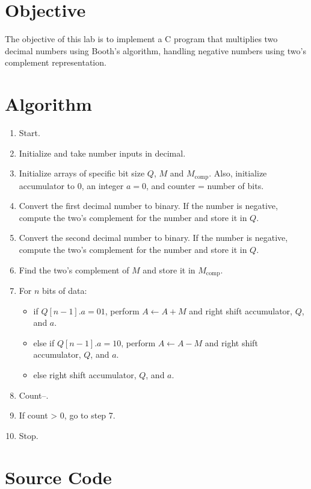 \documentclass[a4paper,12pt]{article}
\begin{document}
\section*{Objective}
The objective of this lab is to implement a C program that multiplies two decimal numbers using Booth's algorithm, handling negative numbers using two's complement representation.

\section*{Algorithm}
\begin{enumerate}
    \item Start.
    \item Initialize and take number inputs in decimal.
    \item Initialize arrays of specific bit size \(Q\), \(M\) and \(M_{\text{comp}}\). Also, initialize accumulator to 0, an integer \(a = 0\), and counter = number of bits.
    \item Convert the first decimal number to binary. If the number is negative, compute the two’s complement for the number and store it in \(Q\).
    \item Convert the second decimal number to binary. If the number is negative, compute the two’s complement for the number and store it in \(Q\).
    \item Find the two’s complement of \(M\) and store it in \(M_{\text{comp}}\).
    \item For \(n\) bits of data:
    \begin{itemize}
        \item if \(Q[n-1].a = 01\), perform \(A \leftarrow A + M\) and right shift accumulator, \(Q\), and \(a\).
        \item else if \(Q[n-1].a = 10\), perform \(A \leftarrow A - M\) and right shift accumulator, \(Q\), and \(a\).
        \item else right shift accumulator, \(Q\), and \(a\).
    \end{itemize}
    \item Count--.
    \item If count > 0, go to step 7.
    \item Stop.
\end{enumerate}

\section*{Source Code}
\end{document}
